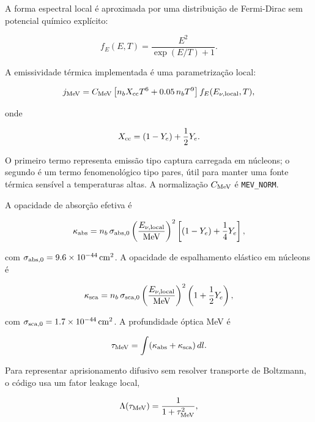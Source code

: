 \documentclass[11pt,a4paper]{article}
\begin{document}
A forma espectral local é aproximada por uma distribuição de Fermi-Dirac sem
potencial químico explícito:

\begin{equation}
  f_E(E,T) = \frac{E^2}{\exp(E/T)+1}.
\end{equation}

A emissividade térmica implementada é uma parametrização local:

\begin{equation}
  j_{\rm MeV} =
  C_{\rm MeV}
  \left[
  n_b X_{\rm cc} T^6
  + 0.05\,n_b T^9
  \right]
  f_E(E_{\nu,\rm local},T),
\end{equation}

onde

\begin{equation}
  X_{\rm cc} = (1-Y_e)+\frac{1}{2}Y_e.
\end{equation}

O primeiro termo representa emissão tipo captura carregada em núcleons; o
segundo é um termo fenomenológico tipo pares, útil para manter uma fonte
térmica sensível a temperaturas altas. A normalização $C_{\rm MeV}$ é
\texttt{MEV\_NORM}.

A opacidade de absorção efetiva é

\begin{equation}
  \kappa_{\rm abs} =
  n_b\,\sigma_{\rm abs,0}
  \left(\frac{E_{\nu,\rm local}}{\rm MeV}\right)^2
  \left[(1-Y_e)+\frac{1}{4}Y_e\right],
\end{equation}

com $\sigma_{\rm abs,0}=9.6\times10^{-44}\,{\rm cm^2}$. A opacidade de
espalhamento elástico em núcleons é

\begin{equation}
  \kappa_{\rm sca} =
  n_b\,\sigma_{\rm sca,0}
  \left(\frac{E_{\nu,\rm local}}{\rm MeV}\right)^2
  \left(1+\frac{1}{2}Y_e\right),
\end{equation}

com $\sigma_{\rm sca,0}=1.7\times10^{-44}\,{\rm cm^2}$. A profundidade óptica
MeV é

\begin{equation}
  \tau_{\rm MeV} =
  \int (\kappa_{\rm abs}+\kappa_{\rm sca})\,dl.
\end{equation}

Para representar aprisionamento difusivo sem resolver transporte de Boltzmann,
o código usa um fator leakage local,

\begin{equation}
  \Lambda(\tau_{\rm MeV}) =
  \frac{1}{1+\tau_{\rm MeV}^2},
\end{equation}
\end{document}

